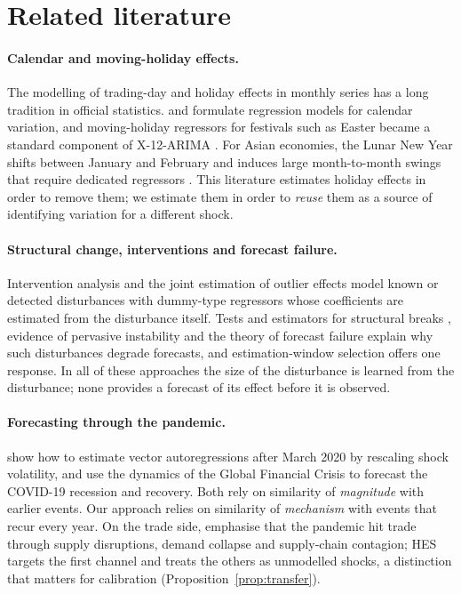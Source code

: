 \documentclass{article}
\theoremstyle{plain}
\theoremstyle{definition}
\theoremstyle{remark}
\begin{document}
\section{Related literature}\label{sec:lit}
\paragraph{Calendar and moving-holiday effects.} The modelling of trading-day and holiday effects in monthly series has a long tradition in official statistics. \citet{cleveland1982calendar} and \citet{bell1983calendar} formulate regression models for calendar variation, and moving-holiday regressors for festivals such as Easter became a standard component of X-12-ARIMA \citep{findley1998x12}. For Asian economies, the Lunar New Year shifts between January and February and induces large month-to-month swings that require dedicated regressors \citep{lin2003lunar}. This literature estimates holiday effects in order to remove them; we estimate them in order to \emph{reuse} them as a source of identifying variation for a different shock.

\paragraph{Structural change, interventions and forecast failure.} Intervention analysis \citep{box1975intervention} and the joint estimation of outlier effects \citep{chen1993joint} model known or detected disturbances with dummy-type regressors whose coefficients are estimated from the disturbance itself. Tests and estimators for structural breaks \citep{perron1989crash, bai1998multiple}, evidence of pervasive instability \citep{stock1996instability} and the theory of forecast failure \citep{clements1998forecasting, rossi2013instability} explain why such disturbances degrade forecasts, and estimation-window selection \citep{pesaran2007window} offers one response. In all of these approaches the size of the disturbance is learned from the disturbance; none provides a forecast of its effect before it is observed.

\paragraph{Forecasting through the pandemic.} \citet{lenza2022var} show how to estimate vector autoregressions after March 2020 by rescaling shock volatility, and \citet{foroni2022covid} use the dynamics of the Global Financial Crisis to forecast the COVID-19 recession and recovery. Both rely on similarity of \emph{magnitude} with earlier events. Our approach relies on similarity of \emph{mechanism} with events that recur every year. On the trade side, \citet{baldwin2020trade} emphasise that the pandemic hit trade through supply disruptions, demand collapse and supply-chain contagion; HES targets the first channel and treats the others as unmodelled shocks, a distinction that matters for calibration (Proposition~\ref{prop:transfer}).
\end{document}
